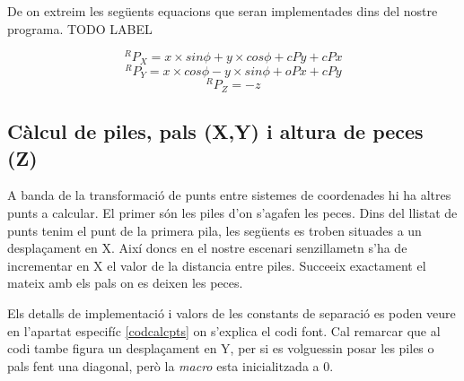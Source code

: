 De on extreim les següents equacions que seran implementades dins del
nostre programa. TODO LABEL

$$^RP_X = x\times sin \phi + y \times cos \phi + cPy + cPx$$
$$^RP_Y = x\times cos \phi - y \times sin \phi + oPx + cPy$$
$$^RP_Z = -z$$

\subsection{Càlcul de piles, pals (X,Y) i altura de peces (Z)} \label{calcpts}
A banda de la transformació de punts entre sistemes de coordenades hi ha altres punts a calcular.
El primer són les piles d'on s'agafen les peces. Dins del llistat de punts tenim el punt de la primera
pila, les següents es troben situades a un desplaçament en X. Així doncs en el nostre escenari
senzillametn s'ha de incrementar en X el valor de la distancia entre piles. Succeeix exactament
el mateix amb els pals on es deixen les peces.

Els detalls de implementació i valors de les constants de separació es poden veure en l'apartat
especifíc \ref{codcalcpts} on s'explica el codi font. Cal remarcar que al codi tambe figura un
desplaçament en Y, per si es volguessin posar les piles o pals fent una diagonal, però la \emph{macro}
esta inicialitzada a 0.




